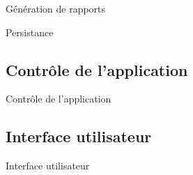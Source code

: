 \begin{frame}{Génération de rapports}
  
\end{frame}

\begin{frame}{Persistance}
  
\end{frame}

\subsection{Contrôle de l'application}
\begin{frame}{Contrôle de l'application}
  
\end{frame}

\subsection{Interface utilisateur}
\begin{frame}{Interface utilisateur}
  
\end{frame}
